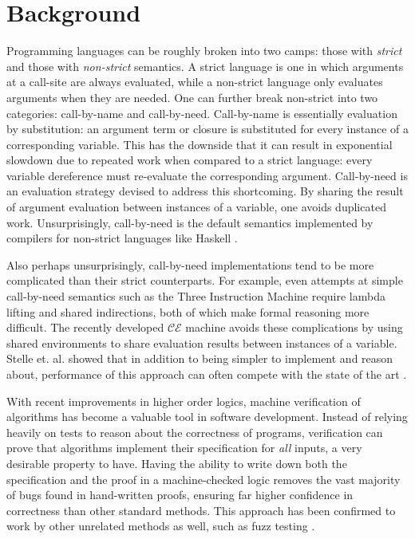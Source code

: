 \section{Background} \label{sec:background}

Programming languages can be roughly broken into two camps: those with
\emph{strict} and those with \emph{non-strict} semantics. A strict language is
one in which arguments at a call-site are always evaluated, while a non-strict
language only evaluates arguments when they are needed. One can further break
non-strict into two categories: call-by-name and call-by-need. Call-by-name is
essentially evaluation by substitution: an argument term or closure is
substituted for every instance of a corresponding variable. This has the
downside that it can result in exponential slowdown due to repeated work when
compared to a strict language: every variable dereference must re-evaluate the
corresponding argument. Call-by-need is an evaluation strategy devised to
address this shortcoming. By sharing the result of argument evaluation between
instances of a variable, one avoids duplicated work.  Unsurprisingly,
call-by-need is the default semantics implemented by compilers for non-strict
languages like Haskell \cite{stg}. 

Also perhaps unsurprisingly, call-by-need implementations tend to be more
complicated than their strict counterparts. For example, even attempts at simple
call-by-need semantics such as the Three Instruction Machine require lambda
lifting and shared indirections, both of which make formal reasoning more
difficult. The recently developed $\mathcal{CE}$ machine avoids these
complications by using shared environments to share evaluation results between
instances of a variable. Stelle et. al. showed that in addition to being simpler
to implement and reason about, performance of this approach can often compete
with the state of the art \cite{cem}. 

With recent improvements in higher order logics, machine verification of
algorithms has become a valuable tool in software development. Instead of
relying heavily on tests to reason about the correctness of programs,
verification can prove that algorithms implement their specification for
\emph{all} inputs, a very desirable property to have. Having the ability to
write down both the specification and the proof in a machine-checked logic
removes the vast majority of bugs found in hand-written proofs, ensuring far
higher confidence in correctness than other standard methods. This approach has
been confirmed to work by other unrelated methods as well, such as fuzz testing
\cite{fuzz}.

